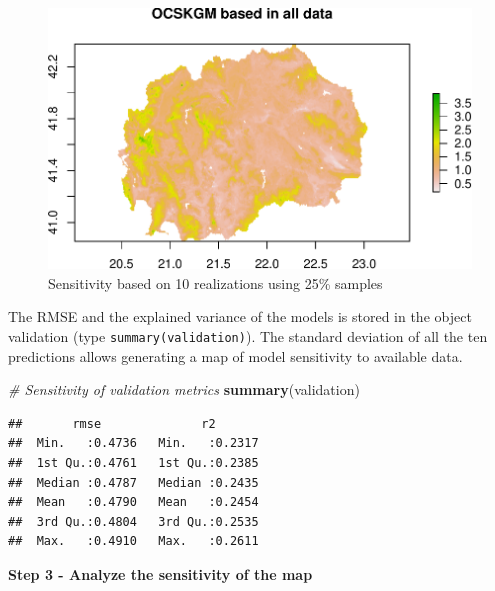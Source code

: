 \documentclass[10pt,b5paper,]{book}
\newenvironment{Shaded}{\begin{snugshade}}{\end{snugshade}}
\newcommand{\CommentTok}[1]{\textcolor[rgb]{0.56,0.35,0.01}{\textit{#1}}}
\newcommand{\DataTypeTok}[1]{\textcolor[rgb]{0.13,0.29,0.53}{#1}}
\newcommand{\DecValTok}[1]{\textcolor[rgb]{0.00,0.00,0.81}{#1}}
\newcommand{\KeywordTok}[1]{\textcolor[rgb]{0.13,0.29,0.53}{\textbf{#1}}}
\newcommand{\NormalTok}[1]{#1}
\newcommand{\StringTok}[1]{\textcolor[rgb]{0.31,0.60,0.02}{#1}}
\theoremstyle{definition}
\theoremstyle{definition}
\theoremstyle{definition}
\theoremstyle{remark}
\begin{document}
\begin{figure}
\centering
\includegraphics{SOCMapping_files/figure-latex/unnamed-chunk-65-1.pdf}
\caption{\label{fig:unnamed-chunk-65}Sensitivity based on 10 realizations
using 25\% samples}
\end{figure}

The RMSE and the explained variance of the models is stored in the
object validation (type \texttt{summary(validation)}). The standard
deviation of all the ten predictions allows generating a map of model
sensitivity to available data.

\begin{Shaded}
\begin{Highlighting}[]
\CommentTok{# Sensitivity of validation metrics}
\KeywordTok{summary}\NormalTok{(validation)}
\end{Highlighting}
\end{Shaded}

\begin{verbatim}
##       rmse              r2        
##  Min.   :0.4736   Min.   :0.2317  
##  1st Qu.:0.4761   1st Qu.:0.2385  
##  Median :0.4787   Median :0.2435  
##  Mean   :0.4790   Mean   :0.2454  
##  3rd Qu.:0.4804   3rd Qu.:0.2535  
##  Max.   :0.4910   Max.   :0.2611
\end{verbatim}

\textbf{Step 3 - Analyze the sensitivity of the map}

\begin{Shaded}
\end{Shaded}
\end{document}
